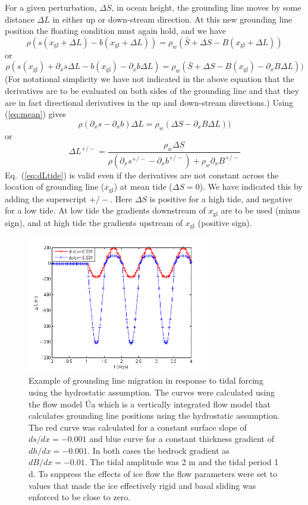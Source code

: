 \documentclass[10pt,a4paper]{book}
\newcommand{\p}{\partial}
\newcommand{\xgl}{x_{\mathrm{gl}}}
\begin{document}
For a given perturbation, $\Delta S$, in ocean height, the grounding
line moves by some distance $\Delta L$ in either up or down-stream direction. At this new grounding line
position the floating condition must again hold, and we have
\[
\rho \left (s(\xgl+\Delta L )-b(\xgl+ \Delta L ) \right )=\rho_w (\bar{S}+\Delta S-B(\xgl+\Delta L)) 
\]
or
\[
\rho (s(\xgl) + \p_x s \Delta L -b(\xgl) - \p_x b  \Delta L )=\rho_w (\bar{S}+\Delta S-B(\xgl) - \p_x B \Delta L)) 
\]
(For notational simplicity we have not indicated in the above equation
that the derivatives are to be evaluated on both sides of the
grounding line and that they are in fact directional derivatives in
the up and down-stream directions.)  Using (\ref{eq:mean}) gives
\[
\rho (\p_x s - \p_x b  ) \Delta L=\rho_w (\Delta S- \p_x B \Delta L)) 
\]
or
\begin{equation}
\Delta L^{+/-} = \frac{\rho_w \Delta S}{\rho (\p_x s^{+/-} - \p_x b^{+/-} ) + \rho_w \p_x B^{+/-}}
\label{eq:dLtide}
\end{equation}
Eq.~(\ref{eq:dLtide}) is valid even if the derivatives are not
constant across the location of grounding line ($\xgl$) at mean tide
($\Delta S=0$). We have indicated this by adding the superscript
$+/-$. Here $\Delta S$ is positive for a high tide, and negative for a
low tide. At low tide the gradients downstream of $\xgl$ are to be
used (minus sign), and at high tide the gradients upstream of $\xgl$
(positive sign).


\begin{figure}
\centerline{\includegraphics[width=8cm]{dLTide.png}}
\caption{Example of grounding line migration in response to tidal
  forcing using the hydrostatic assumption. The curves were calculated
  using the flow model \'Ua which is a vertically integrated flow
  model that calculates grounding line positions using the hydrostatic
  assumption. The red curve was calculated for a constant surface
  slope of $ds/dx=-0.001$ and blue curve for a constant thickness
  gradient of $dh/dx=-0.001$. In both cases the bedrock gradient as
  $dB/dx=-0.01$. The tidal amplitude was 2 m and the tidal period 1 d.
  To suppress the effects of ice flow the flow parameters were set to
  values that made the ice effectively rigid and basal sliding was
  enforced to be close to zero. 
\label{fig:dLTide}}
\end{figure}
\end{document}
